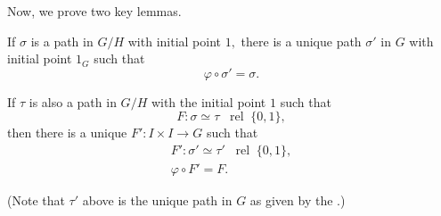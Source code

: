 \documentclass[12pt]{article}
\newcommand{\rel}{\;\;\operatorname{rel}\;}
\begin{document}
Now, we prove two key lemmas. 
\begin{lem} \label{lem:lift}
	If $\sigma$ is a path in $G/H$ with initial point $1,$ there is a unique path $\sigma'$ in $G$ with initial point $1_G$ such that
	\begin{equation*} 
		\varphi \circ \sigma' = \sigma.
	\end{equation*}
\end{lem}
\begin{lem} \label{lem:covhomot}
	If $\tau$ is also a path in $G/H$ with the initial point $1$ such that
	\begin{equation*} 
		F: \sigma \simeq \tau \rel \{0, 1\},
	\end{equation*}
	then there is a unique $F':I\times I \to G$ such that
	\begin{align*} 
		F' : \sigma' \simeq \tau' \rel \{0, 1\},\\
		\varphi \circ F' = F.
	\end{align*}
\end{lem}
(Note that $\tau'$ above is the unique path in $G$ as given by the .)
\end{document}
